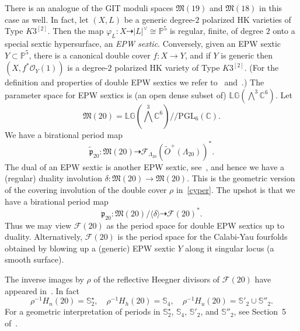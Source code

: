\documentclass[11pt]{amsart}
\numberwithin{equation}{subsection}
\theoremstyle{plain}
\theoremstyle{remark}
\theoremstyle{definition}
\newcommand{\gp}{\mathfrak{p}}
\newcommand{\PGL}{\mathrm{PGL}}
\newcommand{\gquot}{/\!\!/}
\newcommand{\CC}{{\mathbb C}}
\newcommand{\cF}{{\mathscr F}}
\newcommand{\cO}{{\mathscr O}}
\newcommand{\dra}{\dashrightarrow}
\newcommand{\gM}{\mathfrak{M}}
\newcommand{\la}{\langle}
\newcommand{\lagr}{\mathbb{LG}(\bigwedge^ 3 \CC^6)}
\newcommand{\PP}{{\mathbb P}}
\newcommand{\ra}{\rangle}
\newcommand{\wt}{\widetilde}
\begin{document}
There is an analogue of the GIT moduli spaces $\gM(19)$ and $\gM(18)$ in this case as well. 
In fact, let  $(X,L)$ be a generic  degree-$2$ polarized   HK varieties of Type $K3^{[2]}$.
Then the map $\varphi_L\colon X\dra |L|^{\vee}\cong\PP^5$ is regular, finite, of degree $2$ onto a special sextic hypersurface, an \emph{EPW sextic}. Conversely, given an EPW sextic $Y\subset\PP^5$, there is a canonical double cover  $f\colon X\to Y$, and if $Y$ is generic then $(X,f^{*}\cO_Y(1))$ is a degree-$2$ polarized   HK variety of Type $K3^{[2]}$.  (For the definition and properties of double EPW sextics we refer to~\cite{epwduke}  and~\cite{epw}.)  The parameter space for EPW sextics is (an open dense subset of) $\lagr$. Let 
%
\begin{equation}\label{emme20}
%
\gM(20)=\lagr\gquot\PGL_6(\CC).
%
\end{equation}
%
We have a birational period map
%
\begin{equation}\label{perepw}
%
\wt{\gp}_{20}\colon\gM(20)\dra \cF_{\Lambda_{20}}(\wt{O}^{+}(\Lambda_{20}))^{*}.
%
\end{equation}
%
The dual of an EPW sextic is another EPW sextic, see~\cite{dualepw}, and hence we have a (regular) duality involution $\delta\colon\gM(20)\to\gM(20)$. 
This is the geometric version of the covering involution of the double cover $\rho$ in~\eqref{cyper}. 
 The upshot is that we have a birational period map
%
\begin{equation}\label{per20}
%
\gp_{20}\colon\gM(20)/\la\delta\ra\dra \cF(20)^{*}.
%
\end{equation}
%
Thus we may view $\cF(20)$ as the period space for double EPW sextics up to duality. Alternatively, $\cF(20)$ is the period space for the Calabi-Yau fourfolds obtained by blowing up a (generic) EPW sextic $Y$ along it singular locus (a smooth surface). 
 
 The inverse images by $\rho$ of the reflective Heegner divisors of $\cF(20)$ have appeared in~\cite{epwperiods}.  
 In fact
\begin{equation*}
%
\rho^{-1}H_n(20)={\mathbb S}_2^{\star},\quad \rho^{-1}H_h(20)={\mathbb S}_4,
\quad \rho^{-1}H_u(20)={\mathbb S}'_2\cup {\mathbb S}''_2.
%
\end{equation*}
%
For a geometric interpretation of periods in 
${\mathbb S}_2^{\star}$, ${\mathbb S}_4$, 
${\mathbb S}'_2$, and ${\mathbb S}''_2$, see Section~5 of~\cite{epwperiods}.  
%
\end{document}
